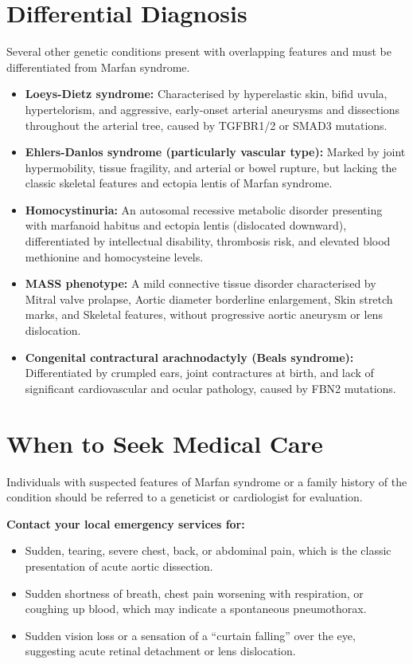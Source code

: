 \section*{Differential Diagnosis}
Several other genetic conditions present with overlapping features and must be differentiated from Marfan syndrome.
\begin{itemize}
    \item \textbf{Loeys-Dietz syndrome:} Characterised by hyperelastic skin, bifid uvula, hypertelorism, and aggressive, early-onset arterial aneurysms and dissections throughout the arterial tree, caused by TGFBR1/2 or SMAD3 mutations.
    \item \textbf{Ehlers-Danlos syndrome (particularly vascular type):} Marked by joint hypermobility, tissue fragility, and arterial or bowel rupture, but lacking the classic skeletal features and ectopia lentis of Marfan syndrome.
    \item \textbf{Homocystinuria:} An autosomal recessive metabolic disorder presenting with marfanoid habitus and ectopia lentis (dislocated downward), differentiated by intellectual disability, thrombosis risk, and elevated blood methionine and homocysteine levels.
    \item \textbf{MASS phenotype:} A mild connective tissue disorder characterised by Mitral valve prolapse, Aortic diameter borderline enlargement, Skin stretch marks, and Skeletal features, without progressive aortic aneurysm or lens dislocation.
    \item \textbf{Congenital contractural arachnodactyly (Beals syndrome):} Differentiated by crumpled ears, joint contractures at birth, and lack of significant cardiovascular and ocular pathology, caused by FBN2 mutations.
\end{itemize}

\section*{When to Seek Medical Care}
Individuals with suspected features of Marfan syndrome or a family history of the condition should be referred to a geneticist or cardiologist for evaluation.

\textbf{Contact your local emergency services for:}
\begin{itemize}
    \item Sudden, tearing, severe chest, back, or abdominal pain, which is the classic presentation of acute aortic dissection.
    \item Sudden shortness of breath, chest pain worsening with respiration, or coughing up blood, which may indicate a spontaneous pneumothorax.
    \item Sudden vision loss or a sensation of a ``curtain falling'' over the eye, suggesting acute retinal detachment or lens dislocation.
\end{itemize}

